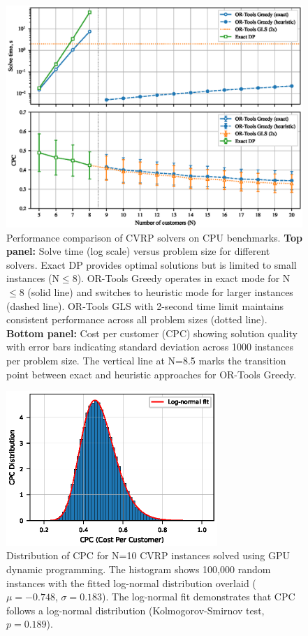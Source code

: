 \documentclass[a4paper,twoside]{article}
\begin{document}
\begin{figure}[t!]
\centering
   \includegraphics[width=160mm]{figures/benchmark.eps}
   \caption{Performance comparison of CVRP solvers on CPU benchmarks. 
       \textbf{Top panel:} Solve time (log scale) versus problem size for different solvers. 
       Exact DP provides optimal solutions but is limited to small instances (N$\leq$8). 
       OR-Tools Greedy operates in exact mode for N$\leq$8 (solid line) and switches to heuristic mode for larger instances (dashed line). 
       OR-Tools GLS with 2-second time limit maintains consistent performance across all problem sizes (dotted line). 
       \textbf{Bottom panel:} Cost per customer (CPC) showing solution quality with error bars indicating standard deviation across 1000 instances per problem size. 
       The vertical line at N=8.5 marks the transition point between exact and heuristic approaches for OR-Tools Greedy.}
\label{fig:benchmark}
\end{figure}

\begin{figure}[t!]
\centering
   \includegraphics[width=80mm]{figures/cpc_histogram_paper_100k.eps}
   \caption{Distribution of CPC for N=10 CVRP instances solved using GPU dynamic programming. The histogram shows 100,000 random instances with the fitted log-normal distribution overlaid ($\mu=-0.748$, $\sigma=0.183$). The log-normal fit demonstrates that CPC follows a log-normal distribution (Kolmogorov-Smirnov test, $p=0.189$).}
\label{fig:cpc_histogram}
\end{figure}
\end{document}
